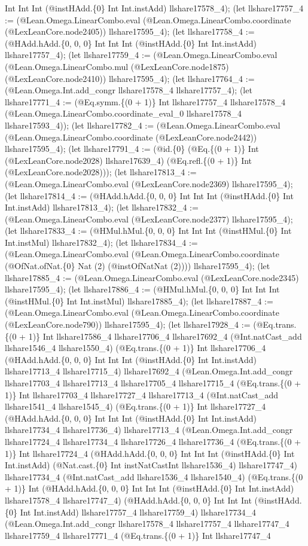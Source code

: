 \documentclass[11pt]{article}
\begin{document}
Int Int Int (@instHAdd.\{0\} Int Int.instAdd) llshare17578\_4); (let llshare17757\_4 := (@Lean.Omega.LinearCombo.eval (@Lean.Omega.LinearCombo.coordinate (@LexLeanCore.node2405)) llshare17595\_4); (let llshare17758\_4 := (@HAdd.hAdd.\{0, 0, 0\} Int Int Int (@instHAdd.\{0\} Int Int.instAdd) llshare17757\_4); (let llshare17759\_4 := (@Lean.Omega.LinearCombo.eval (@Lean.Omega.LinearCombo.mul (@LexLeanCore.node1875) (@LexLeanCore.node2410)) llshare17595\_4); (let llshare17764\_4 := (@Lean.Omega.Int.add\_congr llshare17578\_4 llshare17757\_4); (let llshare17771\_4 := (@Eq.symm.\{(0 + 1)\} Int llshare17757\_4 llshare17578\_4 (@Lean.Omega.LinearCombo.coordinate\_eval\_0 llshare17578\_4 llshare17593\_4)); (let llshare17782\_4 := (@Lean.Omega.LinearCombo.eval (@Lean.Omega.LinearCombo.coordinate (@LexLeanCore.node2442)) llshare17595\_4); (let llshare17791\_4 := (@id.\{0\} (@Eq.\{(0 + 1)\} Int (@LexLeanCore.node2028) llshare17639\_4) (@Eq.refl.\{(0 + 1)\} Int (@LexLeanCore.node2028))); (let llshare17813\_4 := (@Lean.Omega.LinearCombo.eval (@LexLeanCore.node2369) llshare17595\_4); (let llshare17814\_4 := (@HAdd.hAdd.\{0, 0, 0\} Int Int Int (@instHAdd.\{0\} Int Int.instAdd) llshare17813\_4); (let llshare17832\_4 := (@Lean.Omega.LinearCombo.eval (@LexLeanCore.node2377) llshare17595\_4); (let llshare17833\_4 := (@HMul.hMul.\{0, 0, 0\} Int Int Int (@instHMul.\{0\} Int Int.instMul) llshare17832\_4); (let llshare17834\_4 := (@Lean.Omega.LinearCombo.eval (@Lean.Omega.LinearCombo.coordinate (@OfNat.ofNat.\{0\} Nat (2) (@instOfNatNat (2)))) llshare17595\_4); (let llshare17885\_4 := (@Lean.Omega.LinearCombo.eval (@LexLeanCore.node2345) llshare17595\_4); (let llshare17886\_4 := (@HMul.hMul.\{0, 0, 0\} Int Int Int (@instHMul.\{0\} Int Int.instMul) llshare17885\_4); (let llshare17887\_4 := (@Lean.Omega.LinearCombo.eval (@Lean.Omega.LinearCombo.coordinate (@LexLeanCore.node790)) llshare17595\_4); (let llshare17928\_4 := (@Eq.trans.\{(0 + 1)\} Int llshare17586\_4 llshare17706\_4 llshare17692\_4 (@Int.natCast\_add llshare1546\_4 llshare1550\_4) (@Eq.trans.\{(0 + 1)\} Int llshare17706\_4 (@HAdd.hAdd.\{0, 0, 0\} Int Int Int (@instHAdd.\{0\} Int Int.instAdd) llshare17713\_4 llshare17715\_4) llshare17692\_4 (@Lean.Omega.Int.add\_congr llshare17703\_4 llshare17713\_4 llshare17705\_4 llshare17715\_4 (@Eq.trans.\{(0 + 1)\} Int llshare17703\_4 llshare17727\_4 llshare17713\_4 (@Int.natCast\_add llshare1541\_4 llshare1545\_4) (@Eq.trans.\{(0 + 1)\} Int llshare17727\_4 (@HAdd.hAdd.\{0, 0, 0\} Int Int Int (@instHAdd.\{0\} Int Int.instAdd) llshare17734\_4 llshare17736\_4) llshare17713\_4 (@Lean.Omega.Int.add\_congr llshare17724\_4 llshare17734\_4 llshare17726\_4 llshare17736\_4 (@Eq.trans.\{(0 + 1)\} Int llshare17724\_4 (@HAdd.hAdd.\{0, 0, 0\} Int Int Int (@instHAdd.\{0\} Int Int.instAdd) (@Nat.cast.\{0\} Int instNatCastInt llshare1536\_4) llshare17747\_4) llshare17734\_4 (@Int.natCast\_add llshare1536\_4 llshare1540\_4) (@Eq.trans.\{(0 + 1)\} Int (@HAdd.hAdd.\{0, 0, 0\} Int Int Int (@instHAdd.\{0\} Int Int.instAdd) llshare17578\_4 llshare17747\_4) (@HAdd.hAdd.\{0, 0, 0\} Int Int Int (@instHAdd.\{0\} Int Int.instAdd) llshare17757\_4 llshare17759\_4) llshare17734\_4 (@Lean.Omega.Int.add\_congr llshare17578\_4 llshare17757\_4 llshare17747\_4 llshare17759\_4 llshare17771\_4 (@Eq.trans.\{(0 + 1)\} Int llshare17747\_4 
\end{document}
